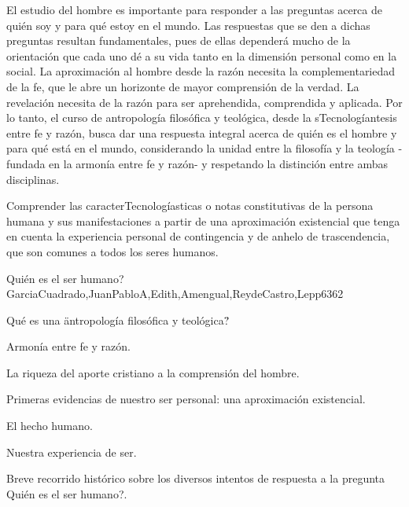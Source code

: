 \begin{syllabus}


\begin{justification}
El estudio del hombre es importante para responder a las preguntas acerca de quién soy y para qué estoy en el mundo. Las respuestas que se den a dichas preguntas resultan fundamentales, pues de ellas dependerá mucho de la orientación que cada uno dé a su vida tanto en la dimensión personal como en la social. La aproximación al hombre desde la razón necesita la complementariedad de la fe, que le abre un horizonte de mayor comprensión de la verdad. La revelación necesita de la razón para ser aprehendida, comprendida y aplicada. Por lo tanto, el curso de antropología filosófica y teológica, desde la sTecnologíantesis entre fe y razón, busca dar una respuesta integral acerca de quién es el hombre y para qué está en el mundo, considerando la unidad entre la filosofía y la teología -fundada en la armonía entre fe y razón- y respetando la distinción entre ambas disciplinas.
\end{justification}

\begin{goals}
\item Comprender las caracterTecnologíasticas o notas constitutivas de la persona humana y sus manifestaciones a partir de una aproximación existencial que tenga en cuenta la experiencia personal de contingencia y de anhelo de trascendencia, que son comunes a todos los seres humanos.
\end{goals}

\begin{outcomes}
\end{outcomes}

\begin{unit}{Quién es el ser humano?}{GarciaCuadrado,JuanPabloA,Edith,Amengual,ReydeCastro,Lepp63}{6}{2}
\begin{topics}
 		\item Qué es una \"antropología filosófica y teológica\"?
 		\item Armonía entre fe y razón.
 		\item La riqueza del aporte cristiano a la comprensión del hombre.
 		\item Primeras evidencias de nuestro ser personal: una aproximación existencial.
 		\item El hecho humano.
 		\item Nuestra experiencia de ser.
 		\item Breve recorrido histórico sobre los diversos intentos de respuesta a la pregunta Quién es el ser humano?. 
\end{topics}


\end{unit}
\end{syllabus}
